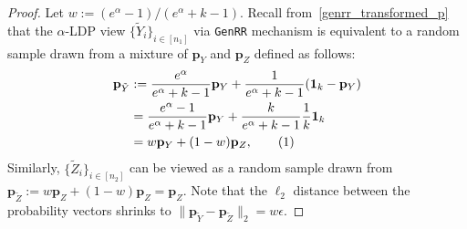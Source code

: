 \documentclass[twoside,11pt]{article}
\newcommand\numberthis{\addtocounter{equation}{1}\tag{\theequation}}
\newcommand{\rvTwo}{Y}
\newcommand{\rvThree}{Z}
\newcommand{\alphabetSize}{k} %
\newcommand{\sampleSize}{n}
\newcommand{\probVec}{\mathbf{p}} %
\newcommand{\privacyParameter}{\alpha} %
\begin{document}
\begin{appendix}
\begin{proof}
		Let $w :=(e^\privacyParameter-1)/(e^\privacyParameter + \alphabetSize-1)$.
		Recall from~\eqref{genrr_transformed_p} that
		the $\privacyParameter$-LDP view  $\{\tilde{\rvTwo}_i\}_{i\in [\sampleSize_1]}$ via \texttt{GenRR} mechanism is equivalent to a random sample drawn from a mixture of $\probVec_{\rvTwo}$ and $\probVec_{\rvThree}$ defined as follows:
		\begin{align*}
			\probVec_{\tilde{\rvTwo}}
			&:=
			\frac
			{e^{\alpha}}
			{e^{\alpha} + \alphabetSize - 1 }
			\probVec_{\rvTwo}
			+
			\frac
			{1}
			{e^{\alpha} + \alphabetSize - 1 }
			(\mathbf{1}_\alphabetSize-\probVec_{\rvTwo})	
			\\&=
			\frac
			{e^{\alpha}-1}
			{e^{\alpha} + \alphabetSize - 1 }
			\probVec_{\rvTwo}
			+
			\frac
			{\alphabetSize}
			{e^{\alpha} + \alphabetSize - 1 }
			\frac{1}{\alphabetSize}
			\mathbf{1}_\alphabetSize
			\\&=
			w\probVec_{\rvTwo} + (1-w)\probVec_{\rvThree},
			\numberthis
			\label{appendix:genrr_powerless:w}
		\end{align*}
		Similarly, $\{\tilde{\rvThree}_i\}_{i \in [n_2]}$
		can be viewed as a random sample drawn from
		$\probVec_{\tilde{\rvThree}} := 	w\probVec_\rvThree +  (1-w) \probVec_{\rvThree} = \probVec_{\rvThree}$.
		Note that the $\ell_2$ distance between the probability vectors shrinks to $\|\probVec_{\tilde{\rvTwo}} - \probVec_{\tilde{\rvThree}} \|_2 = w \epsilon$.
		

\end{proof}
\end{appendix}
\end{document}
